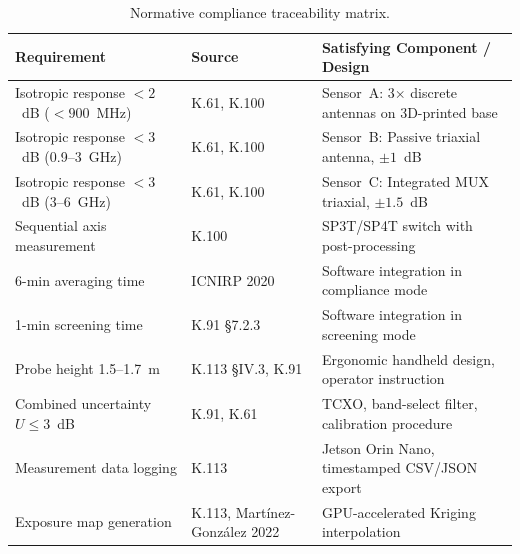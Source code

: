 \documentclass[11pt,a4paper]{article}
\begin{document}
\begin{table}[ht]
\centering
\caption{Normative compliance traceability matrix.}
\label{tab:compliance_matrix}
\small
\begin{tabular}{L{3.5cm} L{3.0cm} L{5.5cm}}
\toprule
\textbf{Requirement} & \textbf{Source} & \textbf{Satisfying Component / Design} \\
\midrule
Isotropic response $< 2$~dB ($< 900$~MHz) & K.61, K.100 & Sensor~A: 3$\times$ discrete antennas on 3D-printed base \\
Isotropic response $< 3$~dB (0.9--3~GHz) & K.61, K.100 & Sensor~B: Passive triaxial antenna, $\pm 1$~dB \\
Isotropic response $< 3$~dB (3--6~GHz) & K.61, K.100 & Sensor~C: Integrated MUX triaxial, $\pm 1.5$~dB \\
Sequential axis measurement & K.100 & SP3T/SP4T switch with post-processing \\
6-min averaging time & ICNIRP 2020 & Software integration in compliance mode \\
1-min screening time & K.91 \S7.2.3 & Software integration in screening mode \\
Probe height 1.5--1.7~m & K.113 \S IV.3, K.91 & Ergonomic handheld design, operator instruction \\
Combined uncertainty $U \leq 3$~dB & K.91, K.61 & TCXO, band-select filter, calibration procedure \\
Measurement data logging & K.113 & Jetson Orin Nano, timestamped CSV/JSON export \\
Exposure map generation & K.113, Mart\'{i}nez-Gonz\'{a}lez 2022 & GPU-accelerated Kriging interpolation \\
\bottomrule
\end{tabular}
\end{table}


\newpage
\nocite{mintic_dec1370_2018, ane_res773_2023, icnirp2020, itut_k52, itut_k61, itut_k91, itut_k100, itut_k113, martinezgonzalez_2022}

\end{document}
